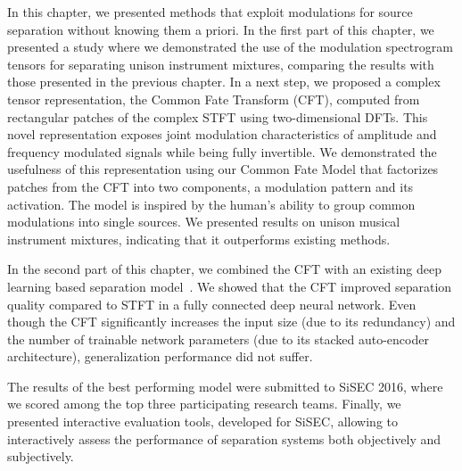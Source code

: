 In this chapter, we presented methods that exploit modulations for source separation without knowing them a priori. 
In the first part of this chapter, we presented a study where we demonstrated the use of the modulation spectrogram tensors for separating unison instrument mixtures, comparing the results with those presented in the previous chapter.
In a next step, we proposed a complex tensor representation, the Common Fate Transform (CFT), computed from rectangular patches of the complex \acs{STFT} using two-dimensional DFTs.
This novel representation exposes joint modulation characteristics of amplitude and frequency modulated signals while being fully invertible.
We demonstrated the usefulness of this representation using our Common Fate Model that factorizes patches from the CFT into two components, a modulation pattern and its activation. 
The model is inspired by the human's ability to group common modulations into single sources.
We presented results on unison musical instrument mixtures, indicating that it outperforms existing methods.
\par
In the second part of this chapter, we combined the CFT with an existing deep learning based separation model~\cite{uhlich15}.
We showed that the CFT improved separation quality compared to \acs{STFT} in a fully connected deep neural network.
Even though the CFT significantly increases the input size (due to its redundancy) and the number of trainable network parameters (due to its stacked auto-encoder architecture), generalization performance did not suffer.
\par
The results of the best performing model were submitted to \acs{SiSEC} 2016, where we scored among the top three participating research teams.
Finally, we presented interactive evaluation tools, developed for \acs{SiSEC}, allowing to interactively assess the performance of separation systems both objectively and subjectively.